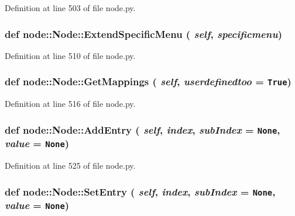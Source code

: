 Definition at line 503 of file node.py.\hypertarget{classnode_1_1Node_6104f59c483766572db1e78ef59140b2}{
\subsubsection[ExtendSpecificMenu]{\setlength{\rightskip}{0pt plus 5cm}def node::Node::Extend\-Specific\-Menu ( {\em self},  {\em specificmenu})}}
\label{classnode_1_1Node_6104f59c483766572db1e78ef59140b2}




Definition at line 510 of file node.py.\hypertarget{classnode_1_1Node_8a9cd8a8392ea36431d1c3d622f9e229}{
\subsubsection[GetMappings]{\setlength{\rightskip}{0pt plus 5cm}def node::Node::Get\-Mappings ( {\em self},  {\em userdefinedtoo} = {\tt True})}}
\label{classnode_1_1Node_8a9cd8a8392ea36431d1c3d622f9e229}




Definition at line 516 of file node.py.\hypertarget{classnode_1_1Node_fddc2e825cf7427ddf51f39485fb9d28}{
\subsubsection[AddEntry]{\setlength{\rightskip}{0pt plus 5cm}def node::Node::Add\-Entry ( {\em self},  {\em index},  {\em sub\-Index} = {\tt None},  {\em value} = {\tt None})}}
\label{classnode_1_1Node_fddc2e825cf7427ddf51f39485fb9d28}




Definition at line 525 of file node.py.\hypertarget{classnode_1_1Node_0584095620f6c553ac66adc114437824}{
\subsubsection[SetEntry]{\setlength{\rightskip}{0pt plus 5cm}def node::Node::Set\-Entry ( {\em self},  {\em index},  {\em sub\-Index} = {\tt None},  {\em value} = {\tt None})}}
\label{classnode_1_1Node_0584095620f6c553ac66adc114437824}




